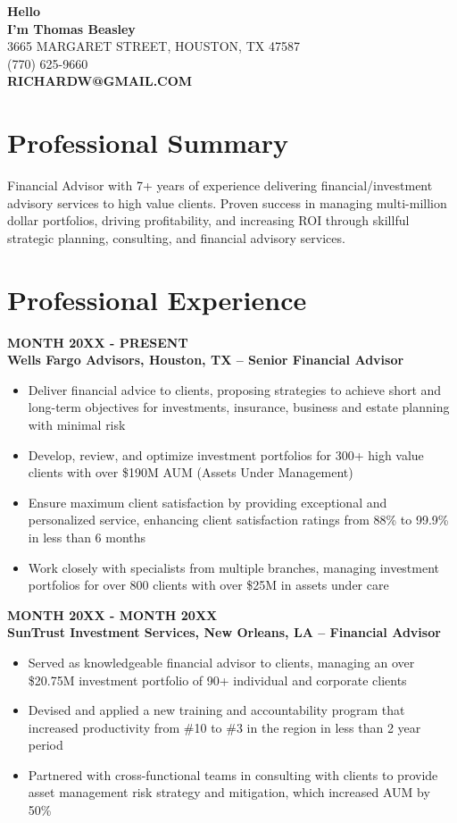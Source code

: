 \documentclass[11pt]{article}
\begin{document}
{\headingfont\color{coral} \Huge \textbf{Hello}}\\[-0.2em]
{\headingfont\LARGE \textbf{I’m Thomas Beasley}}\\[1em]
3665 MARGARET STREET, HOUSTON, TX 47587 \\
(770) 625-9660 \\
\textbf{\color{coral}RICHARDW@GMAIL.COM} \\[1em]

\section*{Professional Summary}
Financial Advisor with 7+ years of experience delivering financial/investment advisory services to high value clients. Proven success in managing multi-million dollar portfolios, driving profitability, and increasing ROI through skillful strategic planning, consulting, and financial advisory services.

\section*{Professional Experience}

\textbf{\uppercase{MONTH 20XX - Present}} \\
\textbf{Wells Fargo Advisors, Houston, TX – Senior Financial Advisor}
\begin{itemize}
    \item Deliver financial advice to clients, proposing strategies to achieve short and long-term objectives for investments, insurance, business and estate planning with minimal risk
    \item Develop, review, and optimize investment portfolios for 300+ high value clients with over \$190M AUM (Assets Under Management)
    \item Ensure maximum client satisfaction by providing exceptional and personalized service, enhancing client satisfaction ratings from 88\% to 99.9\% in less than 6 months
    \item Work closely with specialists from multiple branches, managing investment portfolios for over 800 clients with over \$25M in assets under care
\end{itemize}

\textbf{\uppercase{MONTH 20XX - MONTH 20XX}} \\
\textbf{SunTrust Investment Services, New Orleans, LA – Financial Advisor}
\begin{itemize}
    \item Served as knowledgeable financial advisor to clients, managing an over \$20.75M investment portfolio of 90+ individual and corporate clients
    \item Devised and applied a new training and accountability program that increased productivity from \#10 to \#3 in the region in less than 2 year period
    \item Partnered with cross-functional teams in consulting with clients to provide asset management risk strategy and mitigation, which increased AUM by 50\%
\end{itemize}
\end{document}
